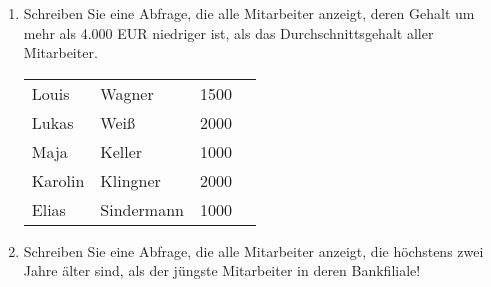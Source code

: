 \begin{enumerate}
\begin{center}
\begin{small}
\begin{msoraclesql}
            \end{msoraclesql}
          \end{small}
        \end{center}
        \item Schreiben Sie eine Abfrage, die alle Mitarbeiter anzeigt, deren
        Gehalt um mehr als 4.000 EUR niedriger ist, als das Durchschnittsgehalt
        aller Mitarbeiter.
        \begin{center}
          \begin{small}
            \tablehead{}
            \begin{msoraclesql}
              \begin{supertabular}{llrr}
                Louis & Wagner & 1500 \\
                Lukas & Weiß & 2000 \\
                Maja & Keller & 1000 \\
                Karolin & Klingner & 2000 \\
                Elias & Sindermann & 1000 \\
              \end{supertabular}
            \end{msoraclesql}
          \end{small}
        \end{center}
\clearpage
        \item Schreiben Sie eine Abfrage, die alle Mitarbeiter anzeigt, die
        höchstens zwei Jahre älter sind, als der jüngste Mitarbeiter in
        deren Bankfiliale! 
        \begin{center}
          \begin{small}
\end{small}
\end{center}
\end{enumerate}
